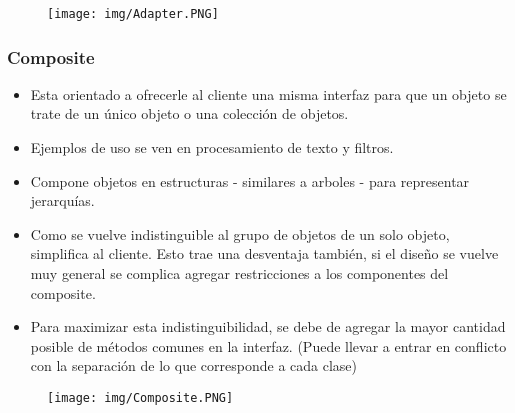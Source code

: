 \begin{figure}[!htb]
    \centering
    \texttt{[image: img/Adapter.PNG]}
\end{figure}

\subsubsection*{Composite}
\begin{itemize}
\item Esta orientado a ofrecerle al cliente una misma interfaz para que un objeto se trate de un único objeto o una colección de objetos.
\item Ejemplos de uso se ven en procesamiento de texto y filtros.
\item Compone objetos en estructuras - similares a arboles - para representar jerarquías.
\item Como se vuelve indistinguible al grupo de objetos de un solo objeto, simplifica al cliente. Esto trae una desventaja también, si el diseño se vuelve muy general se complica agregar restricciones a los componentes del composite.
\item Para maximizar esta indistinguibilidad, se debe de agregar la mayor cantidad posible de métodos comunes en la interfaz. (Puede llevar a entrar en conflicto con la separación de lo que corresponde a cada clase)
\end{itemize}


\begin{figure}[!htb]
    \centering
    \texttt{[image: img/Composite.PNG]}
\end{figure}